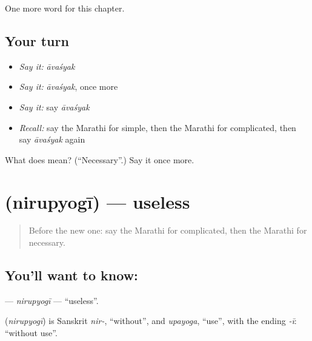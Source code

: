 \begin{grammarlens}[title={What you've built}]
One more word for this chapter.
\end{grammarlens}

\subsection*{Your turn}
\begin{itemize}
\raggedright
  \item \emph{Say it:} \emph{āvaśyak}
  \item \emph{Say it:} \emph{āvaśyak}, once more
  \item \emph{Say it:} say \emph{āvaśyak}
  \item \emph{Recall:} say the Marathi for simple, then the Marathi for complicated, then say \emph{āvaśyak} again
\end{itemize}

\begin{tcolorbox}[breakable,colback=teal!4,colframe=teal!35!black,title={Before you move on}]
What does  mean? (\textquotedblleft{}Necessary\textquotedblright{}.) Say it once more.
\end{tcolorbox}
\section[\texorpdfstring{\mr{निरुपयोगी} (nirupyogī)}{निरुपयोगी (nirupyogī)}]{ (nirupyogī) — useless}

\label{lesson:MR-C259-nirupyogi}



\begin{quote}
Before the new one: say the Marathi for complicated, then the Marathi for necessary.
\end{quote}

\subsection*{You'll want to know: }
\textbf{} — \emph{nirupyogī} — \textquotedblleft{}useless\textquotedblright{}.

\begin{cousinweb}
\textbf{} (\emph{nirupyogī}) is Sanskrit \emph{nir-}, \textquotedblleft{}without\textquotedblright{}, and \emph{upayoga}, \textquotedblleft{}use\textquotedblright{}, with the ending \emph{-ī}: \textquotedblleft{}without use\textquotedblright{}.
\end{cousinweb}

